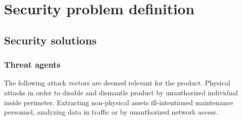 \documentclass[10pt]{article}
\begin{document}



  \section{Security problem definition}

    \subsection{Security solutions}



 \subsubsection{Threat agents}

      The following attack vectors are deemed relevant for the product.
      Physical attacks in order to disable and dismantle product by
      unauthorized individual inside perimeter. Extracting non-physical
      assets ill-intentioned maintenance personnel, analyzing data in
      traffic or by unauthorized network access.
\end{document}
